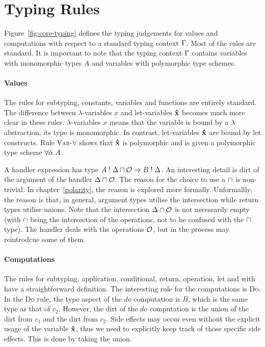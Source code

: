 
\section{Typing Rules}\label{typingrules}
Figure~\ref{fig:core-typing} defines the typing judgements for values and computations with respect to a standard typing context $\Gamma$. Most of the rules are standard. It is important to note that the typing context $\Gamma$ contains variables with monomorphic types $A$ and variables with polymorphic type schemes.

\paragraph{Values}
The rules for subtyping, constants, variables and functions are entirely standard. The difference between $\lambda$-variables $x$ and let-variables $\textbf{\^{x}}$ becomes much more clear in these rules. $\lambda$-variables $x$ means that the variable is bound by a $\lambda$ abstraction, its type is monomorphic. In contrast, let-variables $\textbf{\^{x}}$ are bound by let constructs. Rule \textsc{Var-$\forall$} shows that $\textbf{\^{x}}$ is polymorphic and is given a polymorphic type scheme $\forall \bar{\alpha} . A$. 
 
A handler expression has type $A \mathrel{!} \Delta \sqcap \mathcal{O} \Rightarrow B \mathrel{!} \Delta$. An interesting detail is dirt of the argument of the handler $\Delta \sqcap \mathcal{O}$. The reason for the choice to use a $\sqcap$ is non-trivial. In chapter~\ref{polarity}, the reason is explored more formally. Unformallly, the reason is that, in general, argument types utilise the intersection while return types utilise unions. Note that the intersection $\Delta \cap \mathcal{O}$ is not necessarily empty (with $\cap$ being the intersection of the operations, not to be confused with the $\sqcap$ type). The handler deals with the operations $\mathcal{O}$, but in the process may reintrodcue some of them.

\paragraph{Computations}
The rules for subtyping, application, conditional, return, operation, let and with have a straightforward definition. The interesting rule for the computations is \textsc{Do}. In the \textsc{Do} rule, the type aspect of the $do$ computation is $B$, which is the same type as that of $c_2$. However, the dirt of the $do$ computation is the union of the dirt from $c_1$ and the dirt from $c_2$. Side effects may occur even without the explicit usage of the variable $\textbf{\^{x}}$, thus we need to explicitly keep track of those specific side effects. This is done by taking the union.



